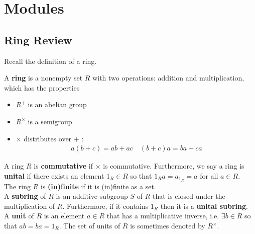 \documentclass{memoir}
\begin{document}


\chapter{Modules}
\label{cha:modules}

\section{Ring Review}
\label{sec:ring_review}



Recall the definition of a ring.

\begin{defn}[Ring]
	A \textbf{ring} is a nonempty set \(R\) with two operations: addition and multiplication, which has the properties
	\begin{itemize}
		\item \(R^{+}\) is an abelian group
		\item \(R^{\times }\) is a semigroup
		\item \(\times \) distributes over \(+\) :
			\begin{align*}
				a(b+c) = ab+ac \quad (b+c)a = ba+ca
			\end{align*}
	\end{itemize}
\end{defn}

\begin{defn}
	A ring \(R\) is \textbf{commutative} if \(\times \) is commutative. Furthermore, we say a ring is \textbf{unital} if there exists an element \(1_R \in R\) so that \(1_R a = a_{1_R} = a\) for all \(a \in R\).\\

The ring \(R\) is \textbf{(in)finite} if it is (in)finite as a set.\\

A \textbf{subring} of \(R\) is an additive subgroup \(S\) of \(R\) that is closed under the multiplication of \(R\). Furthermore, if it contains \(1_R\) then it is a \textbf{unital subring}.\\

A \textbf{unit} of \(R\) is an element \(a \in R\) that has a multiplicative inverse, i.e. \(\exists b \in R\) so that \(ab = ba = 1_R\). The set of units of \(R\) is sometimes denoted by \(R^{\times }\).
\end{defn}
\end{document}
